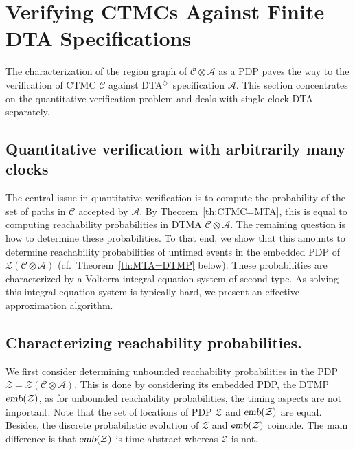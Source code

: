 \documentclass{LMCS}
\newcommand{\mc}[1]{\mathcal{#1}}
\newcommand{\<}{\langle}
\renewcommand{\>}{\rangle}
\newcommand{\mC}{\mathcal{C}}
\newcommand{\mA}{\mathcal{A}}
\newcommand{\DTA}{\textsc{DTA}}
\newcommand{\DTAr}{\DTA$^{\!\Ever}$}
\newcommand{\PDP}{\textsc{PDP}}
\newcommand{\emb}{\textsl{emb}}
\newcommand{\F}{\mathop{\diamondsuit}}
\newcommand{\Ever}{\F}
\begin{document}
\section{Verifying CTMCs Against Finite DTA Specifications} \label{sec:finite}

The characterization of the region graph of $\mc{C} \otimes \mc{A}$ as a PDP paves
the way to the verification of CTMC $\mc{C}$ against \DTAr\ specification $\mc{A}$.
This section concentrates on the quantitative verification problem and deals with
single-clock DTA separately.

\subsection{Quantitative verification with arbitrarily many clocks}\label{sec:general_DTA}

The central issue in quantitative verification is to compute the probability of the set
of paths in $\mC$ accepted by $\mA$.   By Theorem~\ref{th:CTMC=MTA}, this is
equal to computing reachability probabilities in DTMA $\mC \otimes \mA$.   The
remaining question is how to determine these probabilities.  To that end, we show
that this amounts to determine reachability probabilities of untimed events in the
embedded PDP of $\mc{Z}(\mc{C} \otimes \mc{A})$ (cf.\ Theorem~\ref{th:MTA=DTMP} below).  These probabilities are characterized by a Volterra integral equation
system of second type.  As solving this integral equation system is typically hard, we
present an effective approximation algorithm.

\subsection*{Characterizing reachability probabilities.}
\label{sec:general_DTA_characterization}
We first consider determining unbounded reachability probabilities in the \PDP\
$\mc{Z} = \mc{Z}(\mc{C}\otimes\mc{A})$.
This is done by considering its embedded PDP, the DTMP $\emb(\mc{Z})$, as
for unbounded reachability probabilities, the timing aspects are not important.
Note that the set of locations of PDP $\mc{Z}$ and $\emb(\mc{Z})$ are equal.
Besides, the discrete probabilistic evolution of $\mc{Z}$ and $\emb(\mc{Z})$
coincide.  The main difference is that $\emb(\mc{Z})$ is time-abstract whereas
$\mc{Z}$ is not.
\end{document}

